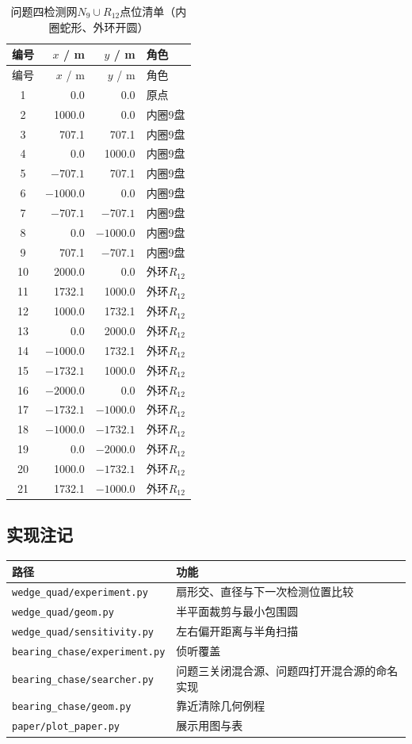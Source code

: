 \documentclass{cumcmthesis}
\begin{document}
{\scriptsize
\begin{longtable}{crrl}
\caption{问题四检测网$N_9\cup R_{12}$点位清单（内圈蛇形、外环开圆）}
\label{tab:q4visit}\\
\toprule
编号 & $x$ / m & $y$ / m & 角色 \\
\midrule
\endfirsthead
\toprule
编号 & $x$ / m & $y$ / m & 角色 \\
\midrule
\endhead
1 & 0.0 & 0.0 & 原点 \\
2 & 1000.0 & 0.0 & 内圈9盘 \\
3 & 707.1 & 707.1 & 内圈9盘 \\
4 & 0.0 & 1000.0 & 内圈9盘 \\
5 & $-707.1$ & 707.1 & 内圈9盘 \\
6 & $-1000.0$ & 0.0 & 内圈9盘 \\
7 & $-707.1$ & $-707.1$ & 内圈9盘 \\
8 & 0.0 & $-1000.0$ & 内圈9盘 \\
9 & 707.1 & $-707.1$ & 内圈9盘 \\
10 & 2000.0 & 0.0 & 外环$R_{12}$ \\
11 & 1732.1 & 1000.0 & 外环$R_{12}$ \\
12 & 1000.0 & 1732.1 & 外环$R_{12}$ \\
13 & 0.0 & 2000.0 & 外环$R_{12}$ \\
14 & $-1000.0$ & 1732.1 & 外环$R_{12}$ \\
15 & $-1732.1$ & 1000.0 & 外环$R_{12}$ \\
16 & $-2000.0$ & 0.0 & 外环$R_{12}$ \\
17 & $-1732.1$ & $-1000.0$ & 外环$R_{12}$ \\
18 & $-1000.0$ & $-1732.1$ & 外环$R_{12}$ \\
19 & 0.0 & $-2000.0$ & 外环$R_{12}$ \\
20 & 1000.0 & $-1732.1$ & 外环$R_{12}$ \\
21 & 1732.1 & $-1000.0$ & 外环$R_{12}$ \\
\bottomrule
\end{longtable}
}

\subsection{实现注记}

{\small
\begin{tabular}{ll}
\toprule
路径 & 功能 \\
\midrule
\texttt{wedge\_quad/experiment.py} & 扇形交、直径与下一次检测位置比较 \\
\texttt{wedge\_quad/geom.py} & 半平面裁剪与最小包围圆 \\
\texttt{wedge\_quad/sensitivity.py} & 左右偏开距离与半角扫描 \\
\texttt{bearing\_chase/experiment.py} & 侦听覆盖 \\
\texttt{bearing\_chase/searcher.py} & 问题三关闭混合源、问题四打开混合源的命名实现 \\
\texttt{bearing\_chase/geom.py} & 靠近清除几何例程 \\
\texttt{paper/plot\_paper.py} & 展示用图与表 \\
\bottomrule
\end{tabular}
}
\end{document}
